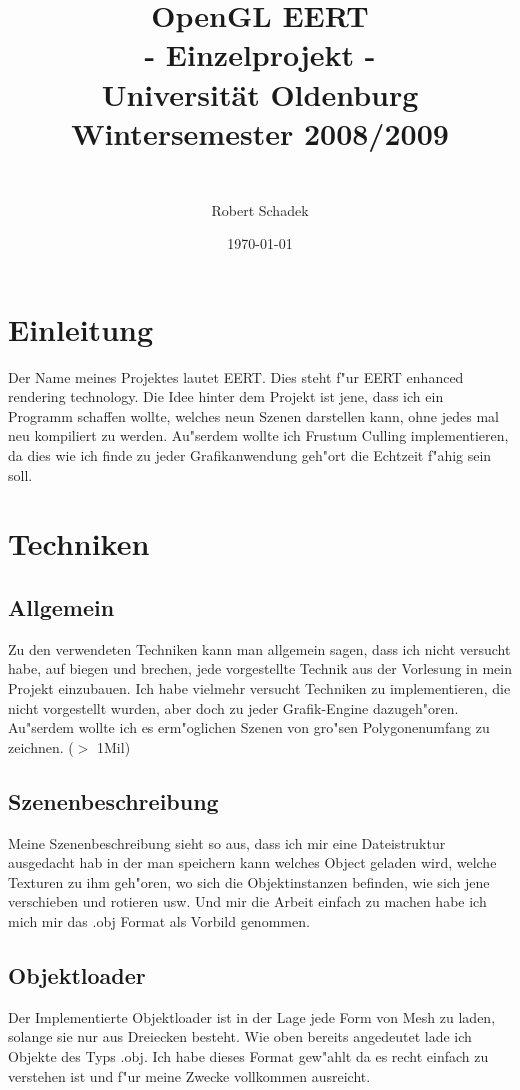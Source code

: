 \documentclass[a4paper,titlepage]{article}
\title{
	{\huge OpenGL EERT\\
	\huge - Einzelprojekt -\\
	{\large Universit\"at Oldenburg}\\
	\large Wintersemester 2008/2009\\
	}
	\date{\today}
	\author{\\
		\large 	Robert Schadek\\
	}
}
\begin{document}
\maketitle
\tableofcontents
\section{Einleitung}
Der Name meines Projektes lautet EERT. Dies steht f"ur EERT enhanced rendering technology.
Die Idee hinter dem Projekt ist jene, dass ich ein Programm schaffen wollte, welches neun
Szenen darstellen kann, ohne jedes mal neu kompiliert zu werden. Au"serdem wollte ich Frustum Culling
implementieren, da dies wie ich finde zu jeder Grafikanwendung geh"ort die Echtzeit f"ahig 
sein soll.
\section{Techniken}
\subsection{Allgemein}
Zu den verwendeten Techniken kann man allgemein sagen, dass ich nicht versucht habe, auf biegen und brechen, jede vorgestellte Technik aus der Vorlesung in mein Projekt einzubauen. Ich habe vielmehr versucht Techniken zu implementieren, die nicht vorgestellt wurden, aber doch zu jeder Grafik-Engine dazugeh"oren. Au"serdem wollte ich es erm"oglichen Szenen von gro"sen Polygonenumfang zu zeichnen. ($>$ 1Mil)

\subsection{Szenenbeschreibung}
Meine Szenenbeschreibung sieht so aus, dass ich mir eine Dateistruktur ausgedacht hab in der man speichern kann welches Object geladen wird, welche Texturen zu ihm geh"oren, wo sich die Objektinstanzen befinden, wie sich jene verschieben und rotieren usw. Und mir die Arbeit einfach zu machen habe ich mich mir das .obj Format als Vorbild genommen.

\subsection{Objektloader}
Der Implementierte Objektloader ist in der Lage jede Form von Mesh zu laden, solange sie nur aus Dreiecken besteht. Wie oben bereits angedeutet lade ich Objekte des Typs .obj. Ich habe dieses Format gew"ahlt da es recht einfach zu verstehen ist und f"ur meine Zwecke vollkommen ausreicht.
\end{document}
